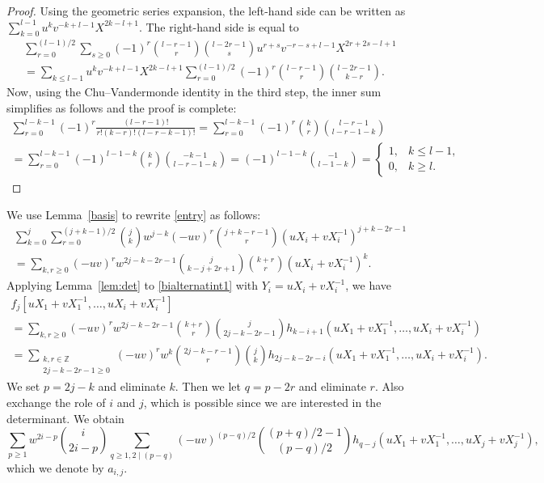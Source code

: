 \documentclass[12pt]{amsart}
\theoremstyle{definition}
\numberwithin{equation}{section}
\begin{document}
\begin{proof}
Using the geometric series expansion, the left-hand side can be written as  
$\sum_{k=0}^{l-1} u^k \allowbreak v^{-k+l-1}  X^{2k-l+1}$.
 The right-hand side is equal to 
\begin{multline*} 
 \sum_{r=0}^{(l-1)/2} \sum_{s \ge 0}  (-1)^r \binom{l-r-1}{r} \binom{l-2r-1}{s} u^{r+s}  v^{-r-s+l-1} X^{2r+2s-l+1}  \\ = 
 \sum_{k \le l-1}  u^{k}  v^{-k+l-1} X^{2k-l+1} \sum_{r=0}^{(l-1)/2} (-1)^r \binom{l-r-1}{r} \binom{l-2r-1}{k-r}. 
 \end{multline*} 
 Now, using the Chu--Vandermonde identity in the third step, the inner sum simplifies as follows and the proof is complete:
 \begin{multline*} 
 \sum_{r=0}^{l-k-1} (-1)^r \frac{(l-r-1)!}{r! (k-r)! (l-r-k-1)!}  = 
 \sum_{r=0}^{l-k-1} (-1)^r \binom{k}{r} \binom{l-r-1}{l-r-1-k}   \\ = 
 \sum_{r=0}^{l-k-1} (-1)^{l-1-k} \binom{k}{r} \binom{-k-1}{l-r-1-k} = (-1)^{l-1-k} \binom{-1}{l-1-k} = 
 \begin{cases} 1, & k \le l-1, \\ 0, & k \ge l. \end{cases}
 \end{multline*} 
\end{proof} 
  
We use Lemma~\ref{basis} to rewrite \eqref{entry} as follows:
\begin{multline*} 
\sum_{k=0}^{j} \sum_{r=0}^{(j+k-1)/2}  \binom{j}{k} w^{j-k} (-uv)^r \binom{j+k-r-1}{r} (u X_i + v X_i^{-1})^{j+k-2r-1} \\ = 
\sum_{k,r \ge 0} (-uv)^r w^{2j-k-2r-1} \binom{j}{k-j+2r+1} \binom{k+r}{r} (u X_i + v X_i^{-1})^{k}.
\end{multline*} 
Applying Lemma~\ref{lem:det} to \eqref{bialternatint1} with $Y_i=u X_i + v X_i^{-1}$, we have 
\begin{multline*}
f_j[u X_1+ v X_1^{-1},\ldots,u X_i+ v X_i^{-1}] \\
= 
\sum_{k,r \ge 0} (-uv)^r w^{2j-k-2r-1} \binom{k+r}{r} \binom{j}{2j-k-2r-1}  
h_{k-i+1}(u X_1+ v X_1^{-1},\ldots,u X_i+ v X_i^{-1}) \\
= \sum_{\substack{k,r \in \mathbb{Z}\\2j-k-2r-1 \ge 0}} 
(-u v)^r w^k \binom{2j-k-r-1}{r} \binom{j}{k} 
h_{2j-k-2r-i}(u X_1+ v X_1^{-1},\ldots,u X_i+ v X_i^{-1}).
\end{multline*} 
We set $p=2j-k$ and eliminate $k$. Then we let $q=p-2r$ and eliminate $r$. 
Also exchange the role of $i$ and $j$, which is possible since we are 
interested in the determinant. We obtain
\begin{equation} 
\label{LGV1} 
\sum_{p \ge 1} w^{2i-p} \binom{i}{2i-p} 
\sum_{q \ge 1, 2 \mid (p-q)} 
(-u v)^{(p-q)/2} \binom{(p+q)/2-1}{(p-q)/2}  
h_{q-j}(u X_1+ v X_1^{-1},\ldots,u X_j+ v X_j^{-1}),
\end{equation} 
which we denote by $a_{i,j} $.
\end{document}

